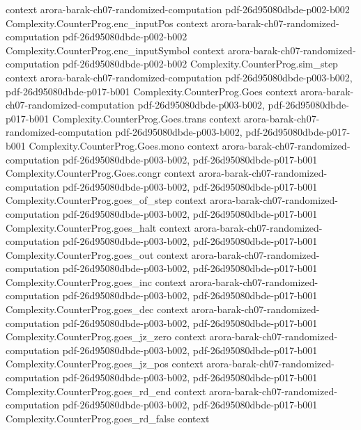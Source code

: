 \begin{theorem}
  {context}
  {arora-barak-ch07-randomized-computation}
  {pdf-26d95080dbde-p002-b002}
\proofstep
  {Complexity.CounterProg.enc_inputPos}
  {context}
  {arora-barak-ch07-randomized-computation}
  {pdf-26d95080dbde-p002-b002}
\proofstep
  {Complexity.CounterProg.enc_inputSymbol}
  {context}
  {arora-barak-ch07-randomized-computation}
  {pdf-26d95080dbde-p002-b002}
\proofstep
  {Complexity.CounterProg.sim_step}
  {context}
  {arora-barak-ch07-randomized-computation}
  {pdf-26d95080dbde-p003-b002,
    pdf-26d95080dbde-p017-b001}
\proofstep
  {Complexity.CounterProg.Goes}
  {context}
  {arora-barak-ch07-randomized-computation}
  {pdf-26d95080dbde-p003-b002,
    pdf-26d95080dbde-p017-b001}
\proofstep
  {Complexity.CounterProg.Goes.trans}
  {context}
  {arora-barak-ch07-randomized-computation}
  {pdf-26d95080dbde-p003-b002,
    pdf-26d95080dbde-p017-b001}
\proofstep
  {Complexity.CounterProg.Goes.mono}
  {context}
  {arora-barak-ch07-randomized-computation}
  {pdf-26d95080dbde-p003-b002,
    pdf-26d95080dbde-p017-b001}
\proofstep
  {Complexity.CounterProg.Goes.congr}
  {context}
  {arora-barak-ch07-randomized-computation}
  {pdf-26d95080dbde-p003-b002,
    pdf-26d95080dbde-p017-b001}
\proofstep
  {Complexity.CounterProg.goes_of_step}
  {context}
  {arora-barak-ch07-randomized-computation}
  {pdf-26d95080dbde-p003-b002,
    pdf-26d95080dbde-p017-b001}
\proofstep
  {Complexity.CounterProg.goes_halt}
  {context}
  {arora-barak-ch07-randomized-computation}
  {pdf-26d95080dbde-p003-b002,
    pdf-26d95080dbde-p017-b001}
\proofstep
  {Complexity.CounterProg.goes_out}
  {context}
  {arora-barak-ch07-randomized-computation}
  {pdf-26d95080dbde-p003-b002,
    pdf-26d95080dbde-p017-b001}
\proofstep
  {Complexity.CounterProg.goes_inc}
  {context}
  {arora-barak-ch07-randomized-computation}
  {pdf-26d95080dbde-p003-b002,
    pdf-26d95080dbde-p017-b001}
\proofstep
  {Complexity.CounterProg.goes_dec}
  {context}
  {arora-barak-ch07-randomized-computation}
  {pdf-26d95080dbde-p003-b002,
    pdf-26d95080dbde-p017-b001}
\proofstep
  {Complexity.CounterProg.goes_jz_zero}
  {context}
  {arora-barak-ch07-randomized-computation}
  {pdf-26d95080dbde-p003-b002,
    pdf-26d95080dbde-p017-b001}
\proofstep
  {Complexity.CounterProg.goes_jz_pos}
  {context}
  {arora-barak-ch07-randomized-computation}
  {pdf-26d95080dbde-p003-b002,
    pdf-26d95080dbde-p017-b001}
\proofstep
  {Complexity.CounterProg.goes_rd_end}
  {context}
  {arora-barak-ch07-randomized-computation}
  {pdf-26d95080dbde-p003-b002,
    pdf-26d95080dbde-p017-b001}
\proofstep
  {Complexity.CounterProg.goes_rd_false}
  {context}

\end{theorem}
